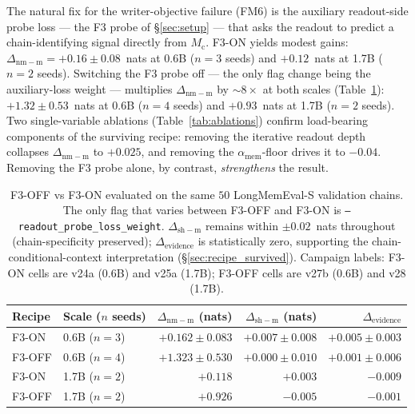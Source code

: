 \documentclass{article}
\newcommand{\Mc}{M_{\mathrm{c}}}
\newcommand{\dnm}{\Delta_{\mathrm{nm-m}}}
\newcommand{\dsh}{\Delta_{\mathrm{sh-m}}}
\newcommand{\elift}{\Delta_{\mathrm{evidence}}}
\newcommand{\amem}{\alpha_{\mathrm{mem}}}
\begin{document}
The natural fix for the writer-objective failure (FM6) is the
auxiliary readout-side probe loss --- the F3 probe of
\S\ref{sec:setup} --- that asks the readout to predict a
chain-identifying signal directly from $\Mc$.  F3-ON yields modest
gains: $\dnm = +0.16 \pm 0.08$~nats at 0.6B ($n=3$ seeds) and
$+0.12$~nats at 1.7B ($n=2$ seeds).  Switching the F3 probe off ---
the only flag change being the auxiliary-loss weight ---
multiplies $\dnm$ by $\sim\!8\times$ at both scales
(Table~\ref{tab:f3_off}): $+1.32 \pm 0.53$~nats at 0.6B ($n=4$ seeds)
and $+0.93$~nats at 1.7B ($n=2$ seeds).  Two single-variable
ablations (Table~\ref{tab:ablations}) confirm load-bearing
components of the surviving recipe: removing the iterative readout
depth collapses $\dnm$ to $+0.025$, and removing the $\amem$-floor
drives it to $-0.04$.  Removing the F3 probe alone, by contrast,
\emph{strengthens} the result.

\begin{table}[t]
\centering
\caption{F3-OFF vs F3-ON evaluated on the same $50$ LongMemEval-S
validation chains.  The only flag that varies between F3-OFF and
F3-ON is \texttt{--readout\_probe\_loss\_weight}.  $\dsh$ remains
within $\pm 0.02$~nats throughout (chain-specificity preserved);
$\elift$ is statistically zero, supporting the
chain-conditional-context interpretation
(\S\ref{sec:recipe_survived}).  Campaign labels: F3-ON cells are
v24a (0.6B) and v25a (1.7B); F3-OFF cells are v27b (0.6B) and v28
(1.7B).}
\label{tab:f3_off}
\small
\begin{tabular}{llrrr}
\toprule
Recipe   & Scale ($n$ seeds) & $\dnm$ (nats)         & $\dsh$ (nats)         & $\elift$ \\
\midrule
F3-ON    & 0.6B ($n=3$)      & $+0.162 \pm 0.083$    & $+0.007 \pm 0.008$    & $+0.005 \pm 0.003$ \\
F3-OFF   & 0.6B ($n=4$)      & $+1.323 \pm 0.530$    & $+0.000 \pm 0.010$    & $+0.001 \pm 0.006$ \\
\midrule
F3-ON    & 1.7B ($n=2$)      & $+0.118$              & $+0.003$              & $-0.009$ \\
F3-OFF   & 1.7B ($n=2$)      & $+0.926$              & $-0.005$              & $-0.001$ \\
\bottomrule
\end{tabular}
\end{table}
\end{document}
